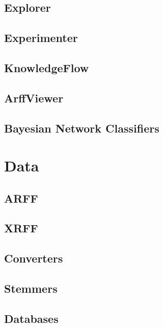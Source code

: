 \documentclass[a4paper]{book}
\begin{document}
\chapter{Explorer}


\chapter{Experimenter}


\chapter{KnowledgeFlow}


\chapter{ArffViewer}


\chapter{Bayesian Network Classifiers}


\part{Data}

\chapter{ARFF}


\chapter{XRFF}
\label{xrff}


\chapter{Converters}


\chapter{Stemmers}


\chapter{Databases}

\end{document}
